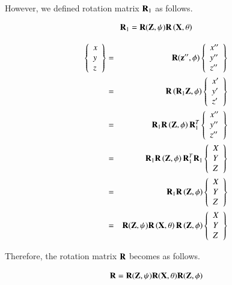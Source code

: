 However, we defined rotation matrix $\mathbf{R}_1$ as follows.

\begin{equation}
\mathbf{R}_1 = \mathbf{R}(\mathbf{Z},\psi)\mathbf{R}\left(\mathbf{X},\theta\right)
\end{equation}


\begin{eqnarray}
\left\{\begin{array}{l}x\\y\\z\end{array}\right\}
&=&
\mathbf{R}(\mathbf{z}'',\phi)
\left\{\begin{array}{l}x''\\y''\\z''\end{array}\right\} \\
&=&
\mathbf{R}\left(\mathbf{R}_1\mathbf{Z},\phi\right)
\left\{\begin{array}{l}x'\\y'\\z'\end{array}\right\}  \\
&=&
\mathbf{R}_1\mathbf{R}\left(\mathbf{Z},\phi\right)\mathbf{R}_1^T
\left\{\begin{array}{l}x''\\y''\\z''\end{array}\right\}\\
&=& \mathbf{R}_1\mathbf{R}\left(\mathbf{Z},\phi\right)\mathbf{R}^T_1\mathbf{R}_1
\left\{\begin{array}{l}X\\Y\\Z\end{array}\right\} \\
&=& \mathbf{R}_1\mathbf{R}\left(\mathbf{Z},\phi\right)
\left\{\begin{array}{l}X\\Y\\Z\end{array}\right\}\\
&=& \mathbf{R}(\mathbf{Z},\psi)\mathbf{R}\left(\mathbf{X},\theta\right)\mathbf{R}\left(\mathbf{Z},\phi\right)
\left\{\begin{array}{l}X\\Y\\Z\end{array}\right\}
\end{eqnarray}

Therefore, the rotation matrix $\mathbf{R}$ becomes as follows.

\begin{tcolorbox}[title=rotation matrix]
\begin{equation}
\mathbf{R} = \mathbf{R}(\mathbf{Z},\psi)\mathbf{R}(\mathbf{X},\theta)\mathbf{R}(\mathbf{Z},\phi)
\end{equation}
\end{tcolorbox}

